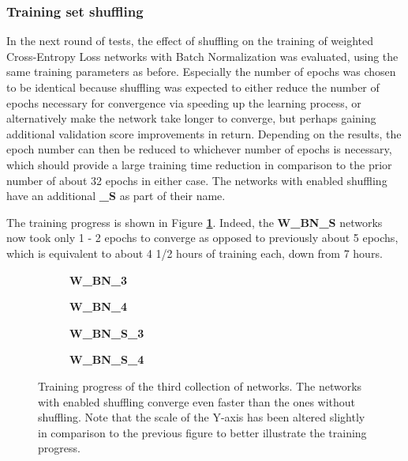 	\subsubsection{Training set shuffling}

In the next round of tests, the effect of shuffling on the training of weighted Cross-Entropy Loss networks with Batch Normalization was evaluated, using the same training parameters as before. Especially the number of epochs was chosen to be identical because shuffling was expected to either reduce the number of epochs necessary for convergence via speeding up the learning process, or alternatively make the network take longer to converge, but perhaps gaining additional validation score improvements in return. Depending on the results, the epoch number can then be reduced to whichever number of epochs is necessary, which should provide a large training time reduction in comparison to the prior number of about 32 epochs in either case. The networks with enabled shuffling have an additional \textbf{\_S} as part of their name.

The training progress is shown in Figure \textbf{\ref{fig:weighted_batchnorm_shuffle_training}}. Indeed, the \textbf{W\_BN\_S} networks now took only 1 - 2 epochs to converge as opposed to previously about 5 epochs, which is equivalent to about 4 1/2 hours of training each, down from 7 hours.


\begin {figure}[!htb]
	\begin {subfigure}[b]{0.4\linewidth}
		\scalebox{0.65}{}
		\caption{\textbf{W\_BN\_3}}
	\end {subfigure}\hspace{1.75cm}
	\begin {subfigure}[b]{0.4\linewidth}
		\scalebox{0.65}{}
		\caption{\textbf{W\_BN\_4}}
	\end {subfigure}

	\begin {subfigure}[b]{0.4\linewidth}
		\scalebox{0.65}{}
		\caption{\textbf{W\_BN\_S\_3}}
	\end {subfigure}\hspace{1.75cm}
	\begin {subfigure}[b]{0.4\linewidth}
		\scalebox{0.65}{}
		\caption{\textbf{W\_BN\_S\_4}}
	\end {subfigure}

		\caption[Training progress of the third collection of networks.]{Training progress of the third collection of networks. The networks with enabled shuffling converge even faster than the ones without shuffling. Note that the scale of the Y-axis has been altered slightly in comparison to the previous figure to better illustrate the training progress.}
		\label{fig:weighted_batchnorm_shuffle_training}
\end {figure}


